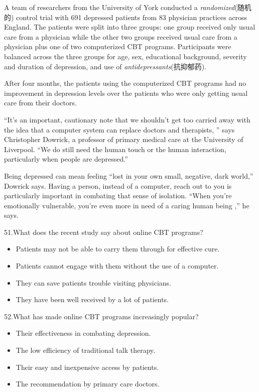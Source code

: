 \documentclass[UTF8,11pt]{ctexart}
\begin{document}
A team of researchers from the University of York conducted a\textit{ randomized}(随机的) control trial with 691 depressed patients from 83 physician practices across England. The patients were split into three groups: one group received only usual care from a physician while the other two groups received usual care from a physician plus one of two computerized CBT programs. Participants were balanced across the three groups for age, sex, educational background, severity and duration of depression, and use of\textit{ antidepressants}(抗抑郁药).


After four months, the patients using the computerized CBT programs had no improvement in depression levels over the patients who were only getting usual care from their doctors.


“It’s an important, cautionary note that we shouldn’t get too carried away with the idea that a computer system can replace doctors and therapists, ” says Christopher Dowrick, a professor of primary medical care at the University of Liverpool. “We do still need the human touch or the human interaction, particularly when people are depressed.”


Being depressed can mean feeling “lost in your own small, negative, dark world,” Dowrick says. Having a person, instead of a computer, reach out to you is particularly important in combating that sense of isolation. “When you’re emotionally vulnerable, you’re even more in need of a caring human being ,” he says.


51.What does the recent study say about online CBT programs?


\begin{itemize}[leftmargin=2em,itemsep=.2em,topsep=.4em]\item[A.] Patients may not be able to carry them through for effective cure.
\item[B.] Patients cannot engage with them without the use of a computer.
\item[C.] They can save patients trouble visiting physicians.
\item[D.] They have been well received by a lot of patients.
\end{itemize}

52.What has made online CBT programs increasingly popular?


\begin{itemize}[leftmargin=2em,itemsep=.2em,topsep=.4em]\item[A.] Their effectiveness in combating depression.
\item[B.] The low efficiency of traditional talk therapy.
\item[C.] Their easy and inexpensive access by patients.
\item[D.] The recommendation by primary care doctors.
\end{itemize}
\end{document}
